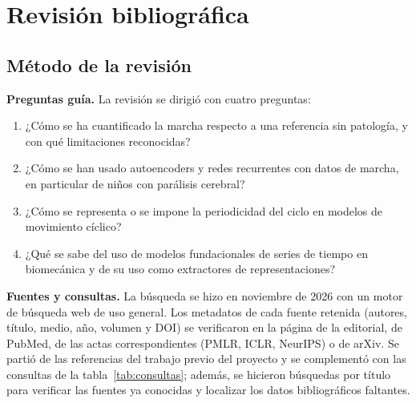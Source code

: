 \documentclass[11pt,a4paper]{article}
\begin{document}
\section{Revisión bibliográfica}
\label{sec:revision}

\subsection{Método de la revisión}
\label{sec:metodo_revision}

\textbf{Preguntas guía.} La revisión se dirigió con cuatro preguntas:
\begin{enumerate}[label=\textbf{P\arabic*.},leftmargin=2.2em]
\item ¿Cómo se ha cuantificado la marcha respecto a una referencia sin patología, y con qué limitaciones reconocidas?
\item ¿Cómo se han usado autoencoders y redes recurrentes con datos de marcha, en particular de niños con parálisis cerebral?
\item ¿Cómo se representa o se impone la periodicidad del ciclo en modelos de movimiento cíclico?
\item ¿Qué se sabe del uso de modelos fundacionales de series de tiempo en biomecánica y de su uso como extractores de representaciones?
\end{enumerate}

\textbf{Fuentes y consultas.} La búsqueda se hizo en noviembre de 2026 con un motor de búsqueda web de uso general. Los metadatos de cada fuente retenida (autores, título, medio, año, volumen y DOI) se verificaron en la página de la editorial, de PubMed, de las actas correspondientes (PMLR, ICLR, NeurIPS) o de arXiv. Se partió de las referencias del trabajo previo del proyecto y se complementó con las consultas de la tabla~\ref{tab:consultas}; además, se hicieron búsquedas por título para verificar las fuentes ya conocidas y localizar los datos bibliográficos faltantes.
\end{document}
